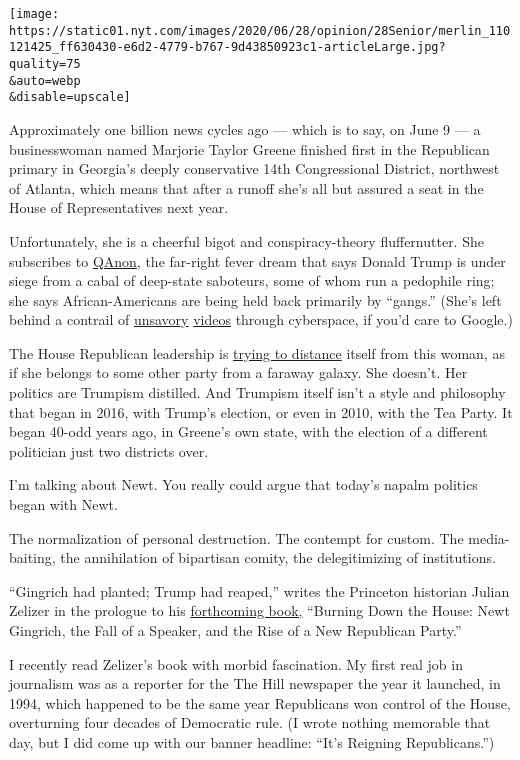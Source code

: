 \texttt{[image: https://static01.nyt.com/images/2020/06/28/opinion/28Senior/merlin\_110121425\_ff630430-e6d2-4779-b767-9d43850923c1-articleLarge.jpg?quality=75\\\&auto=webp\\\&disable=upscale]}

Approximately one billion news cycles ago --- which is to say, on June 9
--- a businesswoman named Marjorie Taylor Greene finished first in the
Republican primary in Georgia's deeply conservative 14th Congressional
District, northwest of Atlanta, which means that after a runoff she's
all but assured a seat in the House of Representatives next year.

Unfortunately, she is a cheerful bigot and conspiracy-theory
fluffernutter. She subscribes to
\href{https://www.nytimes.com/2020/06/18/us/politics/qanon-candidates.html?searchResultPosition=1}{QAnon},
the far-right fever dream that says Donald Trump is under siege from a
cabal of deep-state saboteurs, some of whom run a pedophile ring; she
says African-Americans are being held back primarily by ``gangs.''
(She's left behind a contrail of
\href{https://www.youtube.com/watch?v=2rtYok4fdbQ\&feature=youtu.be}{unsavory}
\href{https://www.politico.com/news/2020/06/17/house-republicans-condemn-gop-candidate-racist-videos-325579}{videos}
through cyberspace, if you'd care to Google.)

The House Republican leadership is
\href{https://www.nytimes.com/2020/06/17/us/marjorie-taylor-greene-georgia.html}{trying
to distance} itself from this woman, as if she belongs to some other
party from a faraway galaxy. She doesn't. Her politics are Trumpism
distilled. And Trumpism itself isn't a style and philosophy that began
in 2016, with Trump's election, or even in 2010, with the Tea Party. It
began 40-odd years ago, in Greene's own state, with the election of a
different politician just two districts over.

I'm talking about Newt. You really could argue that today's napalm
politics began with Newt.

The normalization of personal destruction. The contempt for custom. The
media-baiting, the annihilation of bipartisan comity, the delegitimizing
of institutions.

``Gingrich had planted; Trump had reaped,'' writes the Princeton
historian Julian Zelizer in the prologue to his
\href{https://www.nytimes.com/2020/06/24/books/new-july-books.html}{forthcoming
book,} ``Burning Down the House: Newt Gingrich, the Fall of a Speaker,
and the Rise of a New Republican Party.''

I recently read Zelizer's book with morbid fascination. My first real
job in journalism was as a reporter for the The Hill newspaper the year
it launched, in 1994, which happened to be the same year Republicans won
control of the House, overturning four decades of Democratic rule. (I
wrote nothing memorable that day, but I did come up with our banner
headline: ``It's Reigning Republicans.'')

